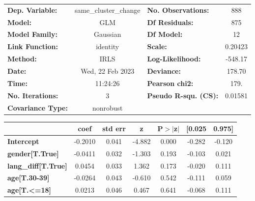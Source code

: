 \begin{center}
\begin{tabular}{lclc}
\toprule
\textbf{Dep. Variable:}       & same\_cluster\_change & \textbf{  No. Observations:  } &      888    \\
\textbf{Model:}               &          GLM          & \textbf{  Df Residuals:      } &      875    \\
\textbf{Model Family:}        &        Gaussian       & \textbf{  Df Model:          } &       12    \\
\textbf{Link Function:}       &        identity       & \textbf{  Scale:             } &   0.20423   \\
\textbf{Method:}              &          IRLS         & \textbf{  Log-Likelihood:    } &   -548.17   \\
\textbf{Date:}                &    Wed, 22 Feb 2023   & \textbf{  Deviance:          } &    178.70   \\
\textbf{Time:}                &        11:24:26       & \textbf{  Pearson chi2:      } &     179.    \\
\textbf{No. Iterations:}      &           3           & \textbf{  Pseudo R-squ. (CS):} &  0.01581    \\
\textbf{Covariance Type:}     &       nonrobust       & \textbf{                     } &             \\
\bottomrule
\end{tabular}
\begin{tabular}{lcccccc}
                              & \textbf{coef} & \textbf{std err} & \textbf{z} & \textbf{P$> |$z$|$} & \textbf{[0.025} & \textbf{0.975]}  \\
\midrule
\textbf{Intercept}            &      -0.2010  &        0.041     &    -4.882  &         0.000        &       -0.282    &       -0.120     \\
\textbf{gender[T.True]}       &      -0.0411  &        0.032     &    -1.303  &         0.193        &       -0.103    &        0.021     \\
\textbf{lang\_diff[T.True]}   &       0.0454  &        0.033     &     1.362  &         0.173        &       -0.020    &        0.111     \\
\textbf{age[T.30-39]}         &      -0.0264  &        0.043     &    -0.610  &         0.542        &       -0.111    &        0.059     \\
\textbf{age[T.<=18]}          &       0.0213  &        0.046     &     0.467  &         0.641        &       -0.068    &        0.111     \\

\end{tabular}
\end{center}
